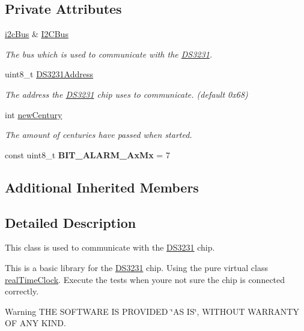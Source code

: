 \subsection*{Private Attributes}
\begin{DoxyCompactItemize}
\item 
\mbox{\hyperlink{classi2c_bus}{i2c\+Bus}} \& \mbox{\hyperlink{class_d_s3231_acffbcfc655349fd392b97dff5f18a56f}{I2\+C\+Bus}}
\begin{DoxyCompactList}\small\item\em The bus which is used to communicate with the \mbox{\hyperlink{class_d_s3231}{D\+S3231}}. \end{DoxyCompactList}\item 
\mbox{\label{class_d_s3231_a905b445bb664b52529b3acbccbbaccb3}} 
uint8\+\_\+t \mbox{\hyperlink{class_d_s3231_a905b445bb664b52529b3acbccbbaccb3}{D\+S3231\+Address}}
\begin{DoxyCompactList}\small\item\em The address the \mbox{\hyperlink{class_d_s3231}{D\+S3231}} chip uses to communicate. (default 0x68) \end{DoxyCompactList}\item 
int \mbox{\hyperlink{class_d_s3231_a15fb987b624cdddde40a15db36665221}{new\+Century}}
\begin{DoxyCompactList}\small\item\em The amount of centuries have passed when started. \end{DoxyCompactList}\item 
\mbox{\label{class_d_s3231_a5f55646a365acc7123c76b2c363eb416}} 
const uint8\+\_\+t {\bfseries B\+I\+T\+\_\+\+A\+L\+A\+R\+M\+\_\+\+Ax\+Mx} = 7
\end{DoxyCompactItemize}
\subsection*{Additional Inherited Members}


\subsection{Detailed Description}
This class is used to communicate with the \mbox{\hyperlink{class_d_s3231}{D\+S3231}} chip. 

This is a basic library for the \mbox{\hyperlink{class_d_s3231}{D\+S3231}} chip. Using the pure virtual class \mbox{\hyperlink{classreal_time_clock}{real\+Time\+Clock}}. Execute the tests when you\textquotesingle{}re not sure the chip is connected correctly. \begin{DoxyWarning}{Warning}
T\+HE S\+O\+F\+T\+W\+A\+RE IS P\+R\+O\+V\+I\+D\+ED \char`\"{}\+A\+S I\+S\char`\"{}, W\+I\+T\+H\+O\+UT W\+A\+R\+R\+A\+N\+TY OF A\+NY K\+I\+ND. 
\end{DoxyWarning}


